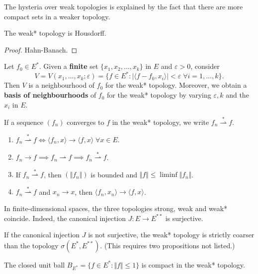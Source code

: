 \documentclass{article}
\theoremstyle{definition}
\numberwithin{equation}{section}
\begin{document}
\begin{remark}
	The hysteria over weak topologies is explained by the fact that there are more compact sets in a weaker topology.
\end{remark}

\begin{prop}
	The weak* topology is Housdorff.
\end{prop}
\begin{proof}
	Hahn-Banach.
\end{proof}
\begin{prop}
	Let $f_0\in E^*$. Given a \textbf{finite} set $\{x_1,x_2,\ldots,x_k\}$ in $E$ and $\varepsilon>0$, consider
	\[V=V(x_1,\ldots,x_k;\varepsilon)=\{f\in E^*:|\langle f-f_0,x_i\rangle|<\varepsilon\;\forall i=1,\ldots,k\}.\]
	Then $V$ is a neighbourhood of $f_0$ for the weak* topology. Moreover, we obtain a \textbf{basis of neighbourhoods} of $f_0$ for the weak* topology by varying $\varepsilon,k$ and the $x_i$ in $E$.
\end{prop}
If a sequence $(f_n)$ converges to $f$ in the weak* topology, we write $f_n\overset{*}{\rightharpoonup}f$.
\begin{prop}
	\begin{enumerate}
		\item $f_n\overset{*}{\rightharpoonup}f \iff \langle f_n,x\rangle\to\langle f,x\rangle\;\forall x\in E$.
		\item $f_n\to f\implies f_n\rightharpoonup f\implies f_n\overset{*}{\rightharpoonup}f$.
		\item If $f_n\overset{*}{\rightharpoonup}f$, then $(\Vert f_n\Vert)$ is bounded and $\Vert f\Vert\leq\liminf\Vert f_n\Vert$.
		\item $f_n\overset{*}{\rightharpoonup}f$ and $x_n\to x$, then $\langle f_n,x_n\rangle\to\langle f,x\rangle$.
	\end{enumerate}
\end{prop}
\begin{remark}
	In finite-dimensional spaces, the three topologies strong, weak and weak* coincide. Indeed, the canonical injection $J:E\to E^{**}$ is surjective.
\end{remark}
\begin{remark}	
	If the canonical injection $J$ is not surjective, the weak* topology is strictly coarser than the topology $\sigma(E^*,E^{**})$. (This requires two propositions not listed.)
\end{remark}
\begin{thm}
	The closed unit ball $B_{E^*}=\{f\in E^*:\Vert f\Vert\leq1\}$ is compact in the weak* topology.
\end{thm}
\end{document}
